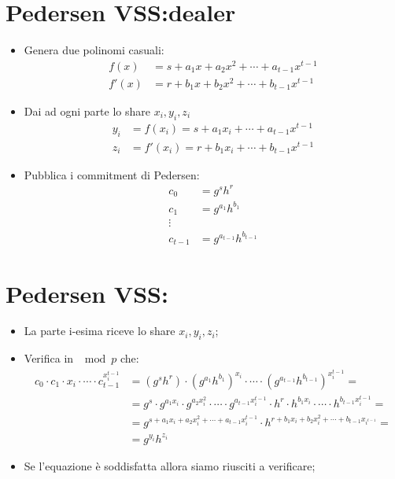 \documentclass{book}
\begin{document}
\section{Pedersen VSS:dealer}
\begin{itemize}
    \item Genera due polinomi casuali:\begin{align*}
              f(x)  & =s+a_{1}x+a_{2}x^2+\cdots +a_{t-1}x^{t-1} \\
              f'(x) & =r+b_{1}x+b_{2}x^2+\cdots +b_{t-1}x^{t-1}
          \end{align*}
    \item Dai ad ogni parte lo share \(x_{i},y_{i},z_{i}\)
          \begin{align*}
              y_{i} & =f(x_{i})=s+a_{1}x_{i}+\cdots +a_{t-1}x^{t-1}  \\
              z_{i} & =f'(x_{i})=r+b_{1}x_{i}+\cdots +b_{t-1}x^{t-1}
          \end{align*}
    \item Pubblica i commitment di Pedersen:\begin{align*}
              c_{0}   & =g^{s}h^r               \\
              c_{1}   & =g^{a_{1}}h^{b_{1}}     \\
              \vdots                            \\
              c_{t-1} & =g^{a_{t-1}}h^{b_{t-1}}
          \end{align*}
\end{itemize}
\section{Pedersen VSS:\@verifier}
\begin{itemize}
    \item La parte i-esima riceve lo share \(x_{i},y_{i},z_{i}\);
    \item Verifica in \(\mod{p}\) che:\begin{align*}
              c_{0}\cdot c_{1}\cdot x_{i}\cdot \cdots \cdot c_{t-1}^{x_{i}^{t-1}} & ={(g^{s}h^{r})}\cdot {(g^{a_{1}}h^{b_{1}})}^{x_{i}}\cdot\cdots\cdot {(g^{a_{t-1}}h^{b_{t-1}})}^{x_{i}^{t-1}}=                                                  \\
                                                                                  & =g^{s}\cdot g^{a_{1}x_{i}}\cdot g^{a_{2}x_{i}^2}\cdot\cdots\cdot g^{a_{t-1}x_{i}^{t-1}}\cdot h^{r}\cdot h^{b_{1}x_{i}}\cdot\cdots\cdot h^{b_{t-1}x_{i}^{t-1}}= \\
                                                                                  & =g^{s+a_{1}x_{i}+a_{2}x_{i}^2+\cdots+ a_{t-1}x_{i}^{t-1}}\cdot h^{r+b_{1}x_{i}+b_{2}x_{i}^2+\cdots+b_{t-1}x_{i^{t-1}}}=                                        \\
                                                                                  & =g^{y_{i}}h^{z_{i}}
          \end{align*}
    \item Se l'equazione è soddisfatta allora siamo riusciti a verificare;
\end{itemize}
\newpage
\end{document}
